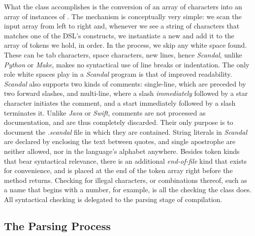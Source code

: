 What the  class accomplishes is the conversion of an array of characters into an array of instances of . The mechanism is conceptually very simple: we scan the input array from left to right and, whenever we see a string of characters that matches one of the DSL's constructs, we instantiate a new  and add it to the array of tokens we hold, in order. In the process, we skip any white space found. These can be tab characters, space characters, new lines, hence \emph{Scandal}, unlike \emph{Python} or \emph{Make}, makes no syntactical use of line breaks or indentation. The only role white spaces play in a \emph{Scandal} program is that of improved readability. \emph{Scandal} also supports two kinds of comments: single-line, which are preceded by two forward slashes, and multi-line, where a slash \emph{immediately} followed by a star character initiates the comment, and a start immediately followed by a slash terminates it. Unlike \emph{Java} or \emph{Swift}, comments are not processed as documentation, and are thus completely discarded. Their only purpose is to document the \emph{.scandal} file in which they are contained. String literals in \emph{Scandal} are declared by enclosing the text between quotes, and single apostrophe are neither allowed, nor in the language's alphabet anywhere. Besides token kinds that bear syntactical relevance, there is an additional \emph{end-of-file} kind that exists for convenience, and is placed at the end of the token array right before the  method returns. Checking for illegal characters, or combinations thereof, such as a name that begins with a number, for example, is all the checking the  class does. All syntactical checking is delegated to the parsing stage of compilation.

\subsection{The Parsing Process}

